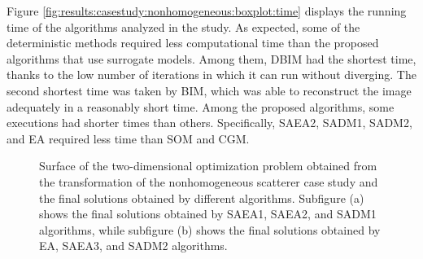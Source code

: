 			Figure \ref{fig:results:casestudy:nonhomogeneous:boxplot:time} displays the running time of the algorithms analyzed in the study. As expected, some of the deterministic methods required less computational time than the proposed algorithms that use surrogate models. Among them, DBIM had the shortest time, thanks to the low number of iterations in which it can run without diverging. The second shortest time was taken by BIM, which was able to reconstruct the image adequately in a reasonably short time. Among the proposed algorithms, some executions had shorter times than others. Specifically, SAEA2, SADM1, SADM2, and EA required less time than SOM and CGM.
		
			\begin{figure}
				\centering
				 \hspace{.05\textwidth}
				\caption[Surface of the two-dimensional optimization problem obtained from the transformation of the nonhomogeneous scatterer case study and the final solutions obtained by different algorithms.]{Surface of the two-dimensional optimization problem obtained from the transformation of the nonhomogeneous scatterer case study and the final solutions obtained by different algorithms. Subfigure (a) shows the final solutions obtained by SAEA1, SAEA2, and SADM1 algorithms, while subfigure (b) shows the final solutions obtained by EA, SAEA3, and SADM2 algorithms.}
				\label{fig:results:casestudy:nonhomogeneous:surface}
			\end{figure}
			
